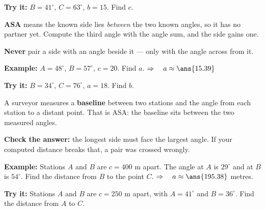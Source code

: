 \documentclass[12pt]{article}
\begin{document}
\begin{tryitbox}
\textbf{Try it:} \quad $B = 41^\circ$, $C = 63^\circ$, $b = 15$. Find $c$.\\[2pt]
\end{tryitbox}


\begin{formulabox}
\textbf{ASA} means the known side lies \emph{between} the two known angles, so it has no partner yet. Compute the third angle with the angle sum, and the side gains one.\par
\textbf{Never} pair a side with an angle beside it --- only with the angle across from it.
\end{formulabox}

\begin{examplebox}
\textbf{Example:} \quad $A = 48^\circ$, $B = 57^\circ$, $c = 20$. Find $a$.
$\Rightarrow\quad a \approx \ans{15.39}$
\end{examplebox}

\begin{tryitbox}
\textbf{Try it:} \quad $B = 34^\circ$, $C = 76^\circ$, $a = 18$. Find $b$.\\[2pt]
\end{tryitbox}


\begin{formulabox}
A surveyor measures a \textbf{baseline} between two stations and the angle from each station to a distant point. That is ASA: the baseline sits between the two measured angles.\par
\textbf{Check the answer:} the longest side must face the largest angle. If your computed distance breaks that, a pair was crossed wrongly.
\end{formulabox}

\begin{examplebox}
\textbf{Example:} \quad Stations $A$ and $B$ are $c = 400$ m apart. The angle at $A$ is $29^\circ$ and at $B$ is $54^\circ$. Find the distance from $B$ to the point $C$.
$\Rightarrow\quad a \approx \ans{195.38}$ metres.
\end{examplebox}

\begin{tryitbox}
\textbf{Try it:} \quad Stations $A$ and $B$ are $c = 250$ m apart, with $A = 41^\circ$ and $B = 36^\circ$. Find the distance from $A$ to $C$.\\[2pt]
\end{tryitbox}
\end{document}
